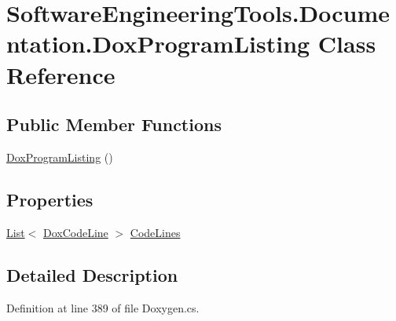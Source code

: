 \hypertarget{class_software_engineering_tools_1_1_documentation_1_1_dox_program_listing}{\section{Software\+Engineering\+Tools.\+Documentation.\+Dox\+Program\+Listing Class Reference}
\label{class_software_engineering_tools_1_1_documentation_1_1_dox_program_listing}
}
\subsection*{Public Member Functions}
\begin{DoxyCompactItemize}
\item 
\hyperlink{class_software_engineering_tools_1_1_documentation_1_1_dox_program_listing_ae36bb300094d9c1864bec13cc633bbea}{Dox\+Program\+Listing} ()
\end{DoxyCompactItemize}
\subsection*{Properties}
\begin{DoxyCompactItemize}
\item 
\hyperlink{namespace_software_engineering_tools_1_1_documentation_ae0bccf4f49a76db084c1c316e5954ec9a4ee29ca12c7d126654bd0e5275de6135}{List}$<$ \hyperlink{class_software_engineering_tools_1_1_documentation_1_1_dox_code_line}{Dox\+Code\+Line} $>$ \hyperlink{class_software_engineering_tools_1_1_documentation_1_1_dox_program_listing_ad169b0ac2e37a32a7f8dd91cc03a4f1c}{Code\+Lines}
\end{DoxyCompactItemize}


\subsection{Detailed Description}


Definition at line 389 of file Doxygen.\+cs.



